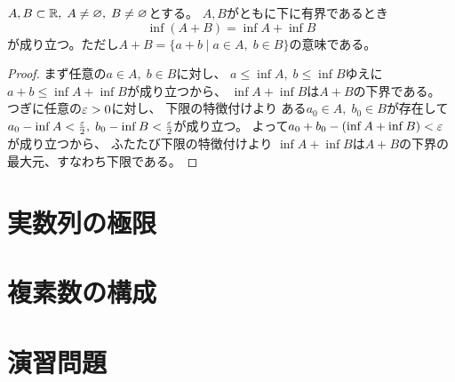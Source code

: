 \documentclass[report]{jlreq}
\begin{document}
\begin{proposition}[和の下限と下限の和]
    $A, B \subset \mathbb{R}, \; A \neq \varnothing, \; B \neq \varnothing$とする。
    $A, B$がともに下に有界であるとき
    \begin{equation}
        \inf (A + B) = \inf A + \inf B
    \end{equation}
    が成り立つ。ただし$A + B = \{ a + b \mid a \in A, \; b \in B \}$の意味である。
\end{proposition}

\begin{proof}
    まず任意の$a \in A, \; b \in B$に対し、
    $a \le \inf A, \; b \le \inf B$ゆえに
    $a + b \le \inf A + \inf B$が成り立つから、
    $\inf A + \inf B$は$A + B$の下界である。
    つぎに任意の$\varepsilon > 0$に対し、
    下限の特徴付けより
    ある$a_0 \in A, \; b_0 \in B$が存在して
    $a_0 - \inf A < \frac{\varepsilon}{2}, \; b_0 - \inf B < \frac{\varepsilon}{2}$が成り立つ。
    よって$a_0 + b_0 - (\inf A + \inf B) < \varepsilon$が成り立つから、
    ふたたび下限の特徴付けより
    $\inf A + \inf B$は$A + B$の下界の最大元、すなわち下限である。
\end{proof}


%
\section{実数列の極限}

\TODO{}


%
\section{複素数の構成}

\begin{definition}[複素数]
\end{definition}



%
\newpage
\section{演習問題}
\end{document}
